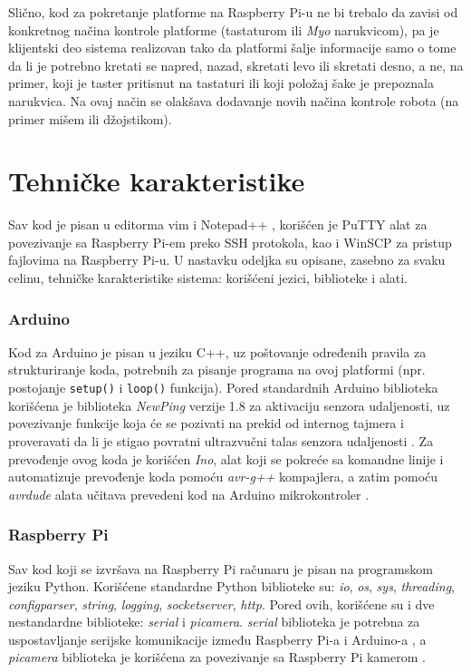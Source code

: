 \documentclass[12pt,a4paper]{report}
\begin{document}
Slično, kod za pokretanje platforme na Raspberry Pi-u ne bi trebalo da zavisi od konkretnog načina kontrole platforme (tastaturom ili \textit{Myo} narukvicom), pa je klijentski deo sistema realizovan tako da platformi šalje informacije samo o tome da li je potrebno kretati se napred, nazad, skretati levo ili skretati desno, a ne, na primer, koji je taster pritisnut na tastaturi ili koji položaj šake je prepoznala narukvica. Na ovaj način se olakšava dodavanje novih načina kontrole robota (na primer mišem ili džojstikom). 

\section{Tehničke karakteristike}

Sav kod je pisan u editorma vim \cite{vim} i Notepad++ \cite{npp}, korišćen je PuTTY \cite{putty} alat za povezivanje sa Raspberry Pi-em preko SSH protokola, kao i WinSCP \cite{winscp} za pristup fajlovima na Raspberry Pi-u. U nastavku odeljka su opisane, zasebno za svaku celinu, tehničke karakteristike sistema: korišćeni jezici, biblioteke i alati.

\subsubsection{Arduino}
Kod za Arduino je pisan u jeziku C++, uz poštovanje određenih pravila za strukturiranje koda, potrebnih za pisanje programa na ovoj platformi (npr. postojanje \texttt{setup()} i \texttt{loop()} funkcija). Pored standardnih Arduino biblioteka korišćena je biblioteka \emph{NewPing} verzije 1.8 za aktivaciju senzora udaljenosti, uz povezivanje funkcije koja će se pozivati na prekid od internog tajmera i proveravati da li je stigao povratni ultrazvučni talas senzora udaljenosti \cite{newping}. Za prevođenje ovog koda je korišćen \emph{Ino}, alat koji se pokreće sa komandne linije i automatizuje prevođenje koda pomoću \textit{avr-g++} kompajlera, a zatim pomoću \textit{avrdude} alata učitava prevedeni kod na Arduino mikrokontroler \cite{ino}.

\subsubsection{Raspberry Pi}

Sav kod koji se izvršava na Raspberry Pi računaru je pisan na programskom jeziku Python. Korišćene standardne Python biblioteke su: \emph{io}, \emph{os}, \emph{sys}, \emph{threading}, \emph{configparser}, \emph{string}, \emph{logging}, \emph{socketserver}, \emph{http}. Pored ovih, korišćene su i dve nestandardne biblioteke: \emph{serial} i \emph{picamera}. \emph{serial} biblioteka je potrebna za uspostavljanje serijske komunikacije između Raspberry Pi-a i Arduino-a \cite{pyserial}, a \emph{picamera} biblioteka je korišćena za povezivanje sa Raspberry Pi kamerom \cite{picamera-lib}.
\end{document}
